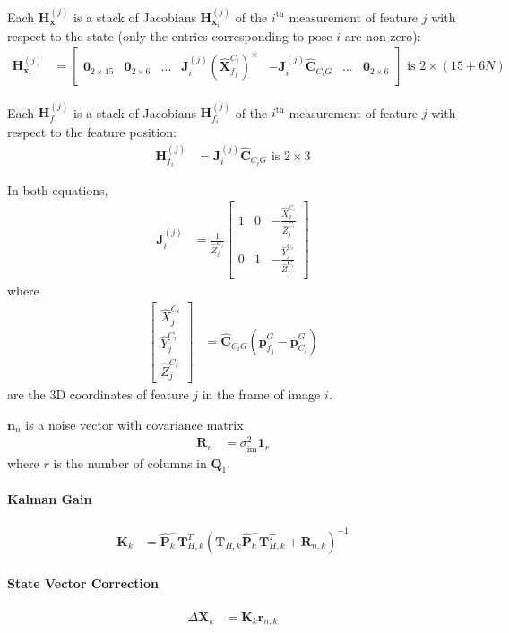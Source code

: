 \documentclass[10pt,letterpaper,fleqn,oneside]{article}
\newcommand{\nl}{\\[0.5em]}
\def\Vec#1{\mathbf{#1}} %
\newcommand{\bbm}{\begin{bmatrix}}
\newcommand{\ebm}{\end{bmatrix}}
\begin{document}
Each $\Vec{H}^{(j)}_\Vec{x}$ is a stack of Jacobians $\Vec{H}^{(j)}_{\Vec{x}_i}$ of the $i^\text{th}$ measurement of feature $j$ with respect to the state (only the entries corresponding to pose $i$ are non-zero):
\begin{align}
\Vec{H}^{(j)}_{\Vec{x}_i} &= \bbm \Vec{0}_{2\times15} & \Vec{0}_{2\times6} & \hdots & \Vec{J}^{\left(j\right)}_i \left(\hat{\Vec{X}}^{C_i}_{f_j}\right)^\times & -\Vec{J}^{\left(j\right)}_i \hat{\Vec{C}}_{C_i G} & \hdots & \Vec{0}_{2\times6} \ebm \text{ is } 2\times\left(15 + 6N\right)
\end{align}

Each $\Vec{H}^{(j)}_f$ is a stack of Jacobians $\Vec{H}^{(j)}_{f_i}$ of the $i^\text{th}$ measurement of feature $j$ with respect to the feature position:
\begin{align}
\Vec{H}^{(j)}_{f_i} &= \Vec{J}^{\left(j\right)}_i \hat{\Vec{C}}_{C_i G}  \text{ is } 2\times3
\end{align}

In both equations,
\begin{align}
\Vec{J}^{\left(j\right)}_i &= \frac{1}{\hat{Z}^{C_i}_j}
\bbm 1 & 0 & -\frac{\hat{X}^{C_i}_j}{\hat{Z}^{C_i}_j} \nl
		 0 & 1 & -\frac{\hat{Y}^{C_i}_j}{\hat{Z}^{C_i}_j}
\ebm
\end{align}
where 
\begin{align}
\bbm \hat{X}^{C_i}_j \nl \hat{Y}^{C_i}_j \nl \hat{Z}^{C_i}_j \ebm &= \hat{\Vec{C}}_{C_i G} \left(\hat{\Vec{p}}^G_{f_j} - \hat{\Vec{p}}^G_{C_i} \right)
\end{align}
are the 3D coordinates of feature $j$ in the frame of image $i$.

$\Vec{n}_n$ is a noise vector with covariance matrix
\begin{align}
\Vec{R}_n &= \sigma^2_{\text{im}} \Vec{1}_r
\end{align}
where $r$ is the number of columns in $\Vec{Q}_1$.

\paragraph{Kalman Gain}
\begin{align}
\Vec{K}_k &= \hat{\Vec{P}}^-_k\Vec{T}_{H,k}^T\left(\Vec{T}_{H,k}\hat{\Vec{P}}^-_k\Vec{T}_{H,k}^T + \Vec{R}_{n,k} \right)^{-1}
\end{align}

\paragraph{State Vector Correction}
\begin{align}
\Delta\Vec{X}_k &= \Vec{K}_k\Vec{r}_{n,k}
\end{align}
\end{document}
